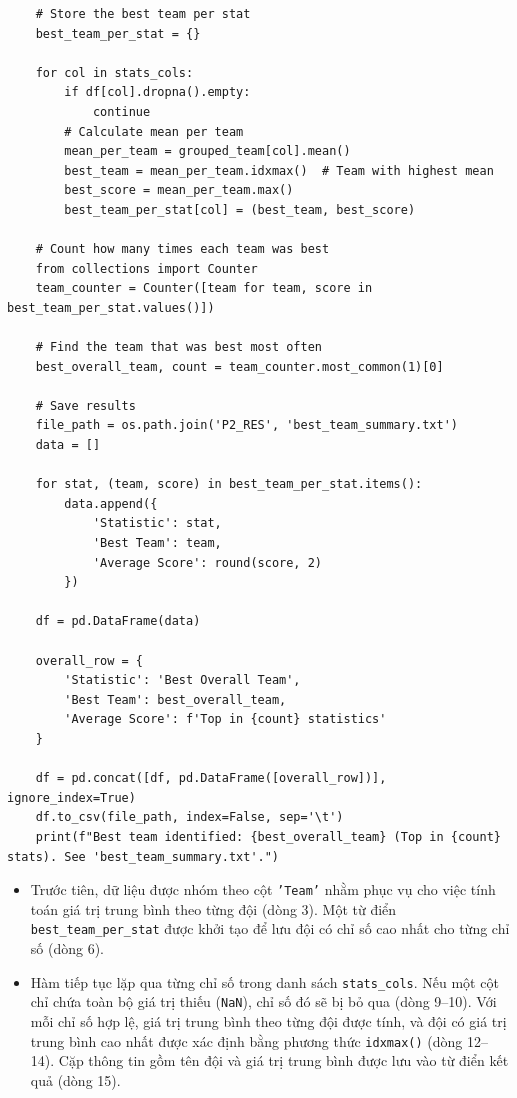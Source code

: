 \documentclass[12pt]{report}
\begin{document}
{\begin{lstlisting}
    # Store the best team per stat
    best_team_per_stat = {}

    for col in stats_cols:
        if df[col].dropna().empty:
            continue
        # Calculate mean per team
        mean_per_team = grouped_team[col].mean()
        best_team = mean_per_team.idxmax()  # Team with highest mean
        best_score = mean_per_team.max()
        best_team_per_stat[col] = (best_team, best_score)

    # Count how many times each team was best
    from collections import Counter
    team_counter = Counter([team for team, score in best_team_per_stat.values()])

    # Find the team that was best most often
    best_overall_team, count = team_counter.most_common(1)[0]

    # Save results
    file_path = os.path.join('P2_RES', 'best_team_summary.txt')
    data = []

    for stat, (team, score) in best_team_per_stat.items():
        data.append({
            'Statistic': stat,
            'Best Team': team,
            'Average Score': round(score, 2)
        })

    df = pd.DataFrame(data)

    overall_row = {
        'Statistic': 'Best Overall Team',
        'Best Team': best_overall_team,
        'Average Score': f'Top in {count} statistics'
    }

    df = pd.concat([df, pd.DataFrame([overall_row])], ignore_index=True)
    df.to_csv(file_path, index=False, sep='\t')
    print(f"Best team identified: {best_overall_team} (Top in {count} stats). See 'best_team_summary.txt'.")
\end{lstlisting}
\begin{itemize}
    \item Trước tiên, dữ liệu được nhóm theo cột \texttt{'Team'} nhằm phục vụ cho việc tính toán giá trị trung bình theo từng đội (dòng 3). Một từ điển \texttt{best\_team\_per\_stat} được khởi tạo để lưu đội có chỉ số cao nhất cho từng chỉ số (dòng 6).

    \item Hàm tiếp tục lặp qua từng chỉ số trong danh sách \texttt{stats\_cols}. Nếu một cột chỉ chứa toàn bộ giá trị thiếu (\texttt{NaN}), chỉ số đó sẽ bị bỏ qua (dòng 9--10). Với mỗi chỉ số hợp lệ, giá trị trung bình theo từng đội được tính, và đội có giá trị trung bình cao nhất được xác định bằng phương thức \texttt{idxmax()} (dòng 12--14). Cặp thông tin gồm tên đội và giá trị trung bình được lưu vào từ điển kết quả (dòng 15).


\end{itemize}}
\end{document}
